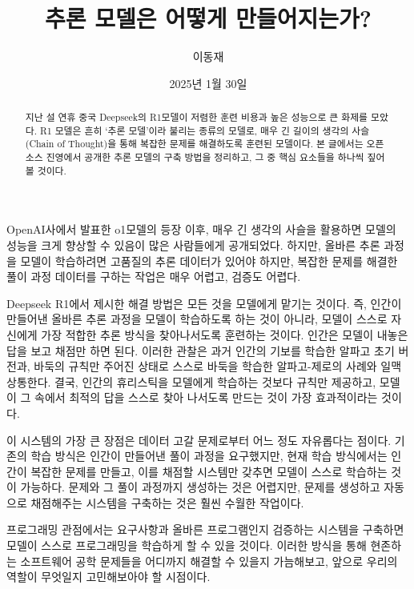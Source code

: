 \documentclass[11pt, oneside]{article}    %
\title{추론 모델은 어떻게 만들어지는가?}
\author{이동재}
\date{2025년 1월 30일}
\begin{document}
\maketitle

\begin{abstract}
    지난 설 연휴 중국 Deepseek의 R1모델이 저렴한 훈련 비용과 높은 성능으로 큰 화제를 모았다. R1 모델은 흔히 `추론 모델'이라 불리는 종류의 모델로, 매우 긴 길이의 생각의 사슬 (Chain of Thought)을 통해 복잡한 문제를 해결하도록 훈련된 모델이다. 본 글에서는 오픈 소스 진영에서 공개한 추론 모델의 구축 방법을 정리하고, 그 중 핵심 요소들을 하나씩 짚어볼 것이다.
\end{abstract}

    OpenAI사에서 발표한 o1모델의 등장 이후, 매우 긴 생각의 사슬을 활용하면 모델의 성능을 크게 향상할 수 있음이 많은 사람들에게 공개되었다. 하지만, 올바른 추론 과정을 모델이 학습하려면 고품질의 추론 데이터가 있어야 하지만, 복잡한 문제를 해결한 풀이 과정 데이터를 구하는 작업은 매우 어렵고, 검증도 어렵다.

    Deepseek R1에서 제시한 해결 방법은 모든 것을 모델에게 맡기는 것이다. 즉, 인간이 만들어낸 올바른 추론 과정을 모델이 학습하도록 하는 것이 아니라, 모델이 스스로 자신에게 가장 적합한 추론 방식을 찾아나서도록 훈련하는 것이다. 인간은 모델이 내놓은 답을 보고 채점만 하면 된다. 이러한 관찰은 과거 인간의 기보를 학습한 알파고 초기 버전과, 바둑의 규칙만 주어진 상태로 스스로 바둑을 학습한 알파고-제로의 사례와 일맥상통한다. 결국, 인간의 휴리스틱을 모델에게 학습하는 것보다 규칙만 제공하고, 모델이 그 속에서 최적의 답을 스스로 찾아 나서도록 만드는 것이 가장 효과적이라는 것이다.

    이 시스템의 가장 큰 장점은 데이터 고갈 문제로부터 어느 정도 자유롭다는 점이다. 기존의 학습 방식은 인간이 만들어낸 풀이 과정을 요구했지만, 현재 학습 방식에서는 인간이 복잡한 문제를 만들고, 이를 채점할 시스템만 갖추면 모델이 스스로 학습하는 것이 가능하다. 문제와 그 풀이 과정까지 생성하는 것은 어렵지만, 문제를 생성하고 자동으로 채점해주는 시스템을 구축하는 것은 훨씬 수월한 작업이다.

    프로그래밍 관점에서는 요구사항과 올바른 프로그램인지 검증하는 시스템을 구축하면 모델이 스스로 프로그래밍을 학습하게 할 수 있을 것이다. 이러한 방식을 통해 현존하는 소프트웨어 공학 문제들을 어디까지 해결할 수 있을지 가늠해보고, 앞으로 우리의 역할이 무엇일지 고민해보아야 할 시점이다.
\end{document}

